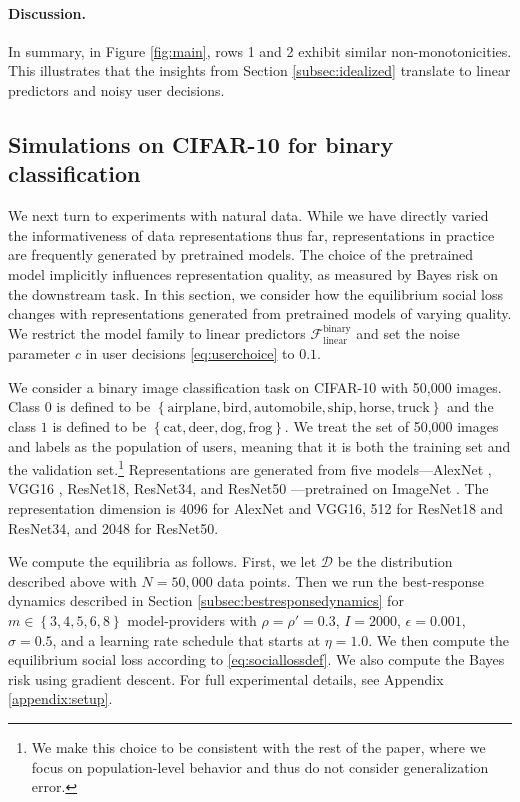\documentclass[letterpaper,11pt]{article}
\theoremstyle{plain}
\begin{document}
\paragraph{Discussion.}
In summary, in Figure \ref{fig:main}, rows 1 and 2  exhibit similar non-monotonicities. This illustrates that the insights from Section \ref{subsec:idealized} translate to linear predictors and noisy user decisions. 

\subsection{Simulations on CIFAR-10 for binary classification}\label{subsec:image}

We next turn to experiments with natural data. While we have directly varied the informativeness of data representations thus far, representations in practice are frequently generated by pretrained models. The choice of the pretrained model implicitly influences representation quality, as measured by Bayes risk on the downstream task. In this section, we consider how the equilibrium social loss changes with representations generated from pretrained models of varying quality. We restrict the model family to linear predictors $\mathcal{F}^{\text{binary}}_{\text{linear}}$ and set the noise parameter $c$ in user decisions \eqref{eq:userchoice} to $0.1$.

We consider a binary image classification task on CIFAR-10 \citep{CIFAR} with 50,000 images. Class $0$ is defined to be $\left\{\text{airplane}, \text{bird}, \text{automobile}, \text{ship}, \text{horse}, \text{truck}\right\}$ and the class $1$ is defined to be $\left\{\text{cat}, \text{deer}, \text{dog}, \text{frog}\right\}$. We treat the set of 50,000 images and labels as the population of users, meaning that it is both the training set and the validation set.\footnote{We make this choice to be consistent with the rest of the paper, where we focus on population-level behavior and thus do not consider  generalization error.} Representations are generated from five models---AlexNet \citep{AlexNet}, VGG16 \citep{VGGref}, ResNet18, ResNet34, and ResNet50 \citep{ResNet}---pretrained on ImageNet \citep{ImageNet}. The representation dimension is 4096 for AlexNet and VGG16, 512 for ResNet18 and ResNet34, and 2048 for ResNet50. 

We compute the equilibria as follows. First, we let $\mathcal{D}$ be the distribution described above with $N = 50,000$ data points. Then we run the best-response dynamics described in Section \ref{subsec:bestresponsedynamics} for $m \in \left\{3, 4, 5, 6, 8\right\}$ model-providers with $\rho = \rho' = 0.3$, $I = 2000$, $\epsilon = 0.001$, $\sigma = 0.5$, and a learning rate schedule that starts at $\eta = 1.0$.  We then compute the equilibrium social loss according to \eqref{eq:sociallossdef}.  We also compute the Bayes risk using gradient descent. For full experimental details, see Appendix \ref{appendix:setup}.  
\end{document}
